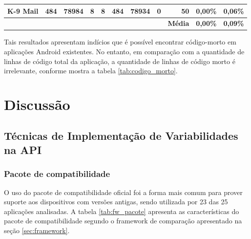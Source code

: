 \begin{table}[!htbp]
\begin{tabular}{lrrrrrrr|r|r|r|}
\multicolumn{1}{|l|}{K-9 Mail}                                                      & \multicolumn{1}{r|}{484}                                                          & \multicolumn{1}{r|}{78984}        & \multicolumn{1}{r|}{8}           & \multicolumn{1}{r|}{8}                                                            & \multicolumn{1}{r|}{484}                                                          & \multicolumn{1}{r|}{78934}        & 0                                                                                 & 50                                  & 0,00\%                                                                            & 0,06\%                               \\ \hline
                                                                                    & \multicolumn{1}{l}{}                                                              & \multicolumn{1}{l}{}              & \multicolumn{1}{l}{}             & \multicolumn{1}{l}{}                                                              & \multicolumn{1}{l}{}                                                              & \multicolumn{1}{l}{}              & \multicolumn{1}{l|}{}                                                             & \multicolumn{1}{l|}{\textbf{Média}} & \textbf{0,00\%}                                                                   & \multicolumn{1}{l|}{\textbf{0,09\%}} \\ \cline{9-11} 
\end{tabular}
\end{table}

Tais resultados apresentam indícios que é possível encontrar código-morto em aplicações
Android existentes. No entanto, em comparação com a quantidade de linhas de código total
da aplicação, a quantidade de linhas de código morto é irrelevante, conforme mostra a
tabela \ref{tab:codigo_morto}.

\section{Discussão} \label{sec:discussao}

\subsection{Técnicas de Implementação de Variabilidades na API} \label{subsec:tecnicas}

\subsubsection{Pacote de compatibilidade}
O uso do pacote de compatibilidade oficial foi a forma mais comum para prover
suporte aos dispositivos com versões antigas, sendo utilizada por 23 das 25
aplicações analisadas. A tabela \ref{tab:fw_pacote} apresenta as características
do pacote de compatibilidade segundo o framework de comparação apresentado na
seção \ref{sec:framework}.


